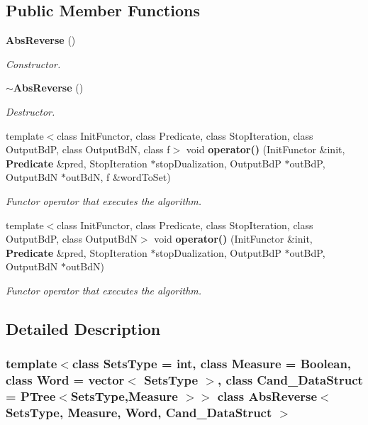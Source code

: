 \subsection*{Public Member Functions}
\begin{CompactItemize}
\item 
{\bf Abs\-Reverse} ()\label{class_abs_reverse_800fd75345935e7c59ee5058be8c4b1c}

\begin{CompactList}\small\item\em Constructor. \item\end{CompactList}\item 
{\bf $\sim$Abs\-Reverse} ()\label{class_abs_reverse_5a78f7a72b09b62b6e5326931890deef}

\begin{CompactList}\small\item\em Destructor. \item\end{CompactList}\item 
template$<$class Init\-Functor, class Predicate, class Stop\-Iteration, class Output\-Bd\-P, class Output\-Bd\-N, class f$>$ void {\bf operator()} (Init\-Functor \&init, {\bf Predicate} \&pred, Stop\-Iteration $\ast$stop\-Dualization, Output\-Bd\-P $\ast$out\-Bd\-P, Output\-Bd\-N $\ast$out\-Bd\-N, f \&word\-To\-Set)
\begin{CompactList}\small\item\em Functor operator that executes the algorithm. \item\end{CompactList}\item 
template$<$class Init\-Functor, class Predicate, class Stop\-Iteration, class Output\-Bd\-P, class Output\-Bd\-N$>$ void {\bf operator()} (Init\-Functor \&init, {\bf Predicate} \&pred, Stop\-Iteration $\ast$stop\-Dualization, Output\-Bd\-P $\ast$out\-Bd\-P, Output\-Bd\-N $\ast$out\-Bd\-N)
\begin{CompactList}\small\item\em Functor operator that executes the algorithm. \item\end{CompactList}\end{CompactItemize}


\subsection{Detailed Description}
\subsubsection*{template$<$class Sets\-Type = int, class Measure = Boolean, class Word = vector$<$ Sets\-Type $>$, class Cand\_\-Data\-Struct = PTree$<$Sets\-Type,Measure $>$$>$ class Abs\-Reverse$<$ Sets\-Type, Measure, Word, Cand\_\-Data\-Struct $>$}

